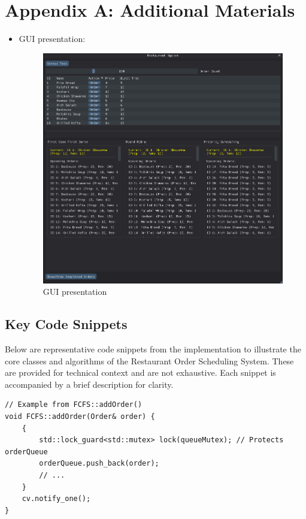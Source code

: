 \documentclass[a4paper,12pt]{article}
\begin{document}
\section{Appendix A: Additional Materials}
\begin{itemize}
    \item GUI presentation:
    \begin{figure}[H] %
        \centering
        \includegraphics[width=1\linewidth]{GUI.jpeg}
        \caption{GUI presentation} %
        \label{fig:gui-presentation}
    \end{figure}
\end{itemize}


\newpage

\subsection*{Key Code Snippets}
Below are representative code snippets from the implementation to illustrate the core classes and algorithms of the Restaurant Order Scheduling System. These are provided for technical context and are not exhaustive. Each snippet is accompanied by a brief description for clarity.

\begin{verbatim}
// Example from FCFS::addOrder()
void FCFS::addOrder(Order& order) {
    {
        std::lock_guard<std::mutex> lock(queueMutex); // Protects orderQueue
        orderQueue.push_back(order);
        // ...
    }
    cv.notify_one(); 
}
    \end{verbatim}
\end{document}
